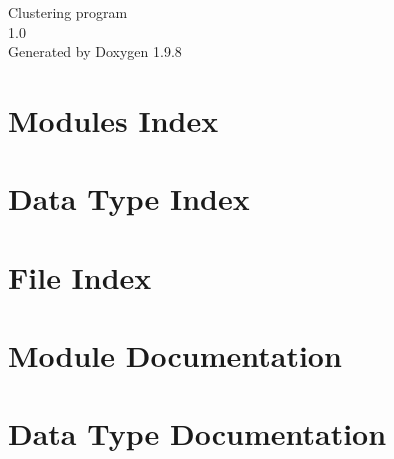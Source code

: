 \documentclass[twoside]{book}
\newcommand{\+}{\discretionary{\mbox{\scriptsize$\hookleftarrow$}}{}{}}
\newcommand{\clearemptydoublepage}{%
    \newpage{\pagestyle{empty}\cleardoublepage}%
  }
\begin{document}
  \raggedbottom
    \hypersetup{pageanchor=false,
                bookmarksnumbered=true,
                pdfencoding=unicode
               }
  \begin{titlepage}
  \vspace*{7cm}
  \begin{center}%
  {\Large Clustering program}\\
  [1ex]\large 1.\+0 \\
  \vspace*{1cm}
  {\large Generated by Doxygen 1.9.8}\\
  \end{center}
  \end{titlepage}
  \clearemptydoublepage
  \tableofcontents
  \clearemptydoublepage
  \hypersetup{pageanchor=true}





\chapter{Modules Index}

\chapter{Data Type Index}

\chapter{File Index}

\chapter{Module Documentation}







\chapter{Data Type Documentation}





\end{document}
